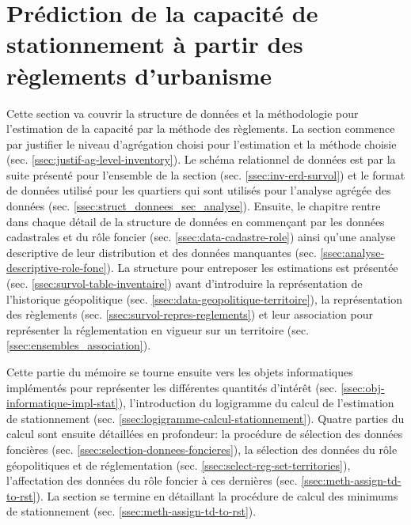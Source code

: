\section{Prédiction de la capacité de stationnement à partir des règlements d'urbanisme}\label{sec:meth_urb_based_inventory}

        Cette section va couvrir la structure de données et la méthodologie pour l'estimation de la capacité par la méthode des règlements. La section commence par justifier le niveau d'agrégation choisi pour l'estimation et la méthode choisie (sec. \ref{ssec:justif-ag-level-inventory}). Le schéma relationnel de données est par la suite présenté pour l'ensemble de la section (sec. \ref{ssec:inv-erd-survol}) et le format de données utilisé pour les quartiers qui sont utilisés pour l'analyse agrégée des données (sec. \ref{ssec:struct_donnees_sec_analyse}). Ensuite, le chapitre rentre dans chaque détail de la structure de données en commençant par les données cadastrales et du rôle foncier (sec. \ref{ssec:data-cadastre-role}) ainsi qu'une analyse descriptive de leur distribution et des données manquantes (sec. \ref{ssec:analyse-descriptive-role-fonc}). La structure pour entreposer les estimations est présentée (sec. \ref{ssec:survol-table-inventaire}) avant d'introduire la représentation de l'historique géopolitique (sec. \ref{ssec:data-geopolitique-territoire}),  la représentation des règlements (sec. \ref{ssec:survol-repres-reglements}) et leur association pour représenter la réglementation en vigueur sur un territoire (sec. \ref{ssec:ensembles_association}).\par
        
        Cette partie du mémoire se tourne ensuite vers les objets informatiques implémentés pour représenter les différentes quantités d'intérêt (sec. \ref{ssec:obj-informatique-impl-stat}), l'introduction du logigramme du calcul de l'estimation de stationnement (sec. \ref{ssec:logigramme-calcul-stationnement}). Quatre parties du calcul sont ensuite détaillées en profondeur: la procédure de sélection des données foncières (sec. \ref{ssec:selection-donnees-foncieres}), la sélection des données du rôle géopolitiques et de réglementation (sec. \ref{ssec:select-reg-set-territories}), l'affectation des données du rôle foncier à ces dernières (sec. \ref{ssec:meth-assign-td-to-rst}). La section se termine en détaillant la procédure de calcul des minimums de stationnement (sec. \ref{ssec:meth-assign-td-to-rst}).\par
        
